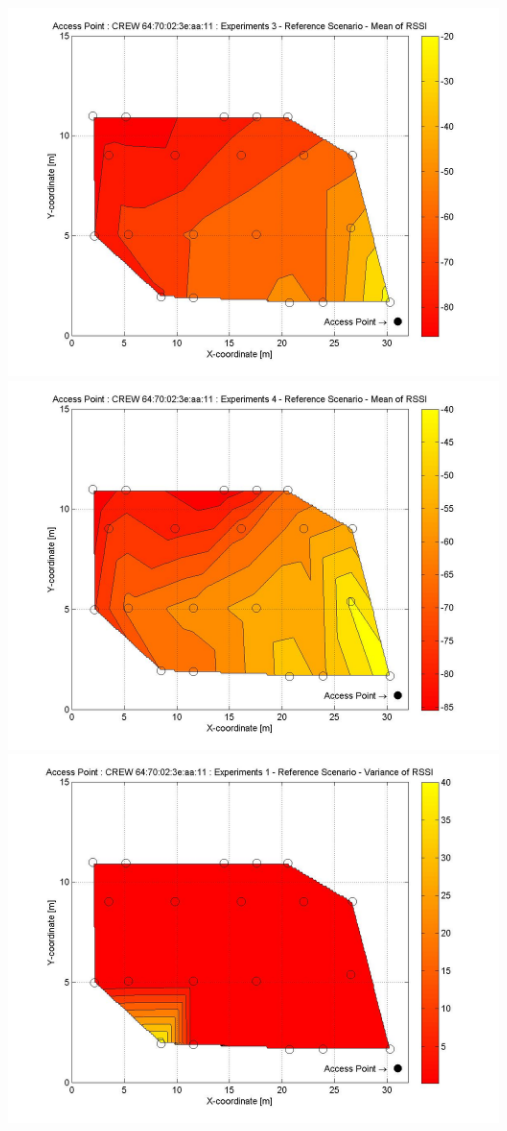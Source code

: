 \documentclass[11pt,a4paper,headinclude,footinclude,chapterprefix=on]{scrreprt}
\begin{document}
\begin{longtable}
	\includegraphics[width=13cm]{../../Source/plot/CREW_11/11_Ref_Ex_3_Mean.jpg} \\
	\includegraphics[width=13cm]{../../Source/plot/CREW_11/11_Ref_Ex_4_Mean.jpg} \\
	\includegraphics[width=13cm]{../../Source/plot/CREW_11/11_Ref_Ex_1_Variance.jpg} \\

\end{longtable}
\end{document}
